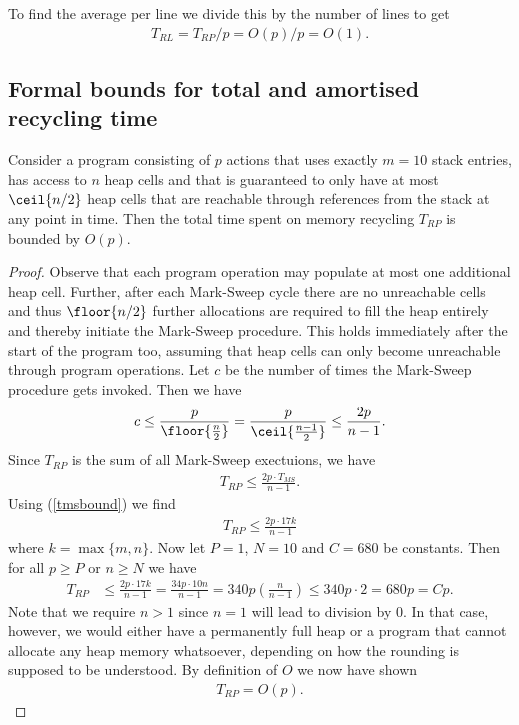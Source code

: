 \documentclass{article}
\begin{document}
To find the average per line we divide this by the number of lines to get
\begin{align*}
    T_{RL} = T_{RP}/p = O(p)/p = O(1).
\end{align*}


\subsection{Formal bounds for total and amortised recycling time}

\begin{claim}
    Consider a program consisting of $p$ actions that uses exactly $m=10$
    stack entries, has access to $n$ heap cells and that is guaranteed to only
    have at most $\ceil{n/2}$ heap cells that are reachable through references
    from the stack at any point in time. Then the total time spent on memory recycling $T_{RP}$ is
    bounded by $O(p)$.
\end{claim}
\begin{proof}
    Observe that each program operation may populate at most one additional heap cell.
    Further, after each Mark-Sweep cycle there are no unreachable cells and thus
    $\floor{n/2}$ further allocations are required to fill the heap entirely and
    thereby initiate the Mark-Sweep procedure. This holds immediately after
    the start of the program too, assuming that heap cells can only become unreachable
    through program operations. Let $c$ be the number of times the Mark-Sweep
    procedure gets invoked. Then we have
    \begin{align*}
        c \leq \frac{p}{\floor{\frac{n}{2}}} = \frac{p}{\ceil{\frac{n-1}{2}}} \leq \frac{2p}{n-1}.
    \end{align*}
    Since $T_{RP}$ is the sum of all Mark-Sweep exectuions, we have
    \begin{align*}
        T_{RP} \leq\frac{2p \cdot T_{MS}}{n-1}. 
    \end{align*}
    Using (\ref{tmsbound}) we find
    \begin{align}
        \label{trbound}
        T_{RP}\leq\frac{2p\cdot 17k}{n-1}
    \end{align}
    where $k=\max\{m,n\}$. Now let $P=1$, $N=10$ and $C=680$ be constants. Then
    for all $p\geq P$ or $n\geq N$ we have
    \begin{align*}
        T_{RP} &\leq \frac{2p\cdot 17k}{n-1} = \frac{34p\cdot 10n}{n-1} = 340p\left(\frac{n}{n-1}\right)
        \leq 340p\cdot 2 = 680p = Cp.
    \end{align*}
    Note that we require $n>1$ since $n=1$ will lead to
    division by $0$. In that case, however, we would either have a permanently full heap
    or a program that cannot allocate any heap memory whatsoever, depending on how the
    rounding is supposed to be understood.
    By definition of $O$ we now have shown
    \begin{align*}
        T_{RP} = O(p).
    \end{align*}
\end{proof}
\end{document}
